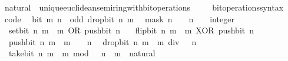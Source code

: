 \begin{isabellebody}
\endisatagproof
{\isafoldproof}%
%
\isadelimproof
%
\endisadelimproof
\isanewline
\isanewline
{}\isamarkupfalse%
\isanewline
\isanewline
{}\isamarkupfalse%
\ natural\ {\isacharcolon}{\kern0pt}{\isacharcolon}{\kern0pt}\ unique{\isacharunderscore}{\kern0pt}euclidean{\isacharunderscore}{\kern0pt}semiring{\isacharunderscore}{\kern0pt}with{\isacharunderscore}{\kern0pt}bit{\isacharunderscore}{\kern0pt}operations%
\isadelimproof
\ %
\endisadelimproof
%
\isatagproof
\isacommand{{\isachardot}{\kern0pt}{\isachardot}{\kern0pt}}\isamarkupfalse%
%
\endisatagproof
{\isafoldproof}%
%
\isadelimproof
%
\endisadelimproof
\isanewline
\isanewline
{}\isamarkupfalse%
\isanewline
\ \ \ bit{\isacharunderscore}{\kern0pt}operations{\isacharunderscore}{\kern0pt}syntax\isanewline
{}\isanewline
\isanewline
{}\isamarkupfalse%
\ {\isacharbrackleft}{\kern0pt}code{\isacharbrackright}{\kern0pt}{\isacharcolon}{\kern0pt}\isanewline
\ \ {\isacartoucheopen}bit\ m\ n\ {\isasymlongleftrightarrow}\ odd\ {\isacharparenleft}{\kern0pt}drop{\isacharunderscore}{\kern0pt}bit\ n\ m{\isacharparenright}{\kern0pt}{\isacartoucheclose}\isanewline
\ \ {\isacartoucheopen}mask\ n\ {\isacharequal}{\kern0pt}\ {}\ {\isacharcircum}{\kern0pt}\ n\ {\isacharminus}{\kern0pt}\ {\isacharparenleft}{\kern0pt}{}\ {\isacharcolon}{\kern0pt}{\isacharcolon}{\kern0pt}\ integer{\isacharparenright}{\kern0pt}{\isacartoucheclose}\isanewline
\ \ {\isacartoucheopen}set{\isacharunderscore}{\kern0pt}bit\ n\ m\ {\isacharequal}{\kern0pt}\ m\ OR\ push{\isacharunderscore}{\kern0pt}bit\ n\ {}{\isacartoucheclose}\isanewline
\ \ {\isacartoucheopen}flip{\isacharunderscore}{\kern0pt}bit\ n\ m\ {\isacharequal}{\kern0pt}\ m\ XOR\ push{\isacharunderscore}{\kern0pt}bit\ n\ {}{\isacartoucheclose}\isanewline
\ \ {\isacartoucheopen}push{\isacharunderscore}{\kern0pt}bit\ n\ m\ {\isacharequal}{\kern0pt}\ m\ {\isacharasterisk}{\kern0pt}\ {}\ {\isacharcircum}{\kern0pt}\ n{\isacartoucheclose}\isanewline
\ \ {\isacartoucheopen}drop{\isacharunderscore}{\kern0pt}bit\ n\ m\ {\isacharequal}{\kern0pt}\ m\ div\ {}\ {\isacharcircum}{\kern0pt}\ n{\isacartoucheclose}\isanewline
\ \ {\isacartoucheopen}take{\isacharunderscore}{\kern0pt}bit\ n\ m\ {\isacharequal}{\kern0pt}\ m\ mod\ {}\ {\isacharcircum}{\kern0pt}\ n{\isacartoucheclose}\ \ m\ {\isacharcolon}{\kern0pt}{\isacharcolon}{\kern0pt}\ natural\isanewline
%
\isadelimproof
\ \ %
\endisadelimproof
%
\isatagproof
{}\isamarkupfalse%

\end{isabellebody}
